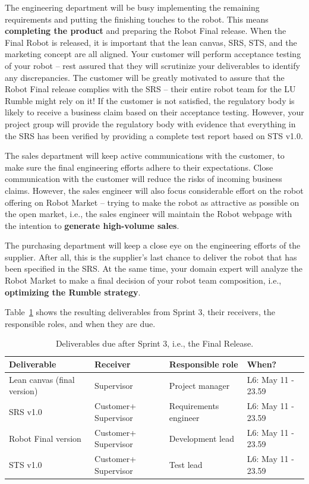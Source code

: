 \documentclass{scrreprt}
\begin{document}
The engineering department will be busy implementing the remaining requirements and putting the finishing touches to the robot. This means \textbf{completing the product} and preparing the Robot Final release. When the Final Robot is released, it is important that the lean canvas, SRS, STS, and the marketing concept are all aligned. Your customer will perform acceptance testing of your robot -- rest assured that they will scrutinize your deliverables to identify any discrepancies. The customer will be greatly motivated to assure that the Robot Final release complies with the SRS -- their entire robot team for the LU Rumble might rely on it! If the customer is not satisfied, the regulatory body is likely to receive a business claim based on their acceptance testing. However, your project group will provide the regulatory body with evidence that everything in the SRS has been verified by providing a complete test report based on STS v1.0.
 
The sales department will keep active communications with the customer, to make sure the final engineering efforts adhere to their expectations. Close communication with the customer will reduce the risks of incoming business claims. However, the sales engineer will also focus considerable effort on the robot offering on Robot Market -- trying to make the robot as attractive as possible on the open market, i.e., the sales engineer will maintain the Robot webpage with the intention to \textbf{generate high-volume sales}.

The purchasing department will keep a close eye on the engineering efforts of the supplier. After all, this is the supplier's last chance to deliver the robot that has been specified in the SRS. At the same time, your domain expert will analyze the Robot Market to make a final decision of your robot team composition, i.e., \textbf{optimizing the Rumble strategy}. 

Table~\ref{tab:sprint3} shows the resulting deliverables from Sprint 3, their receivers, the responsible roles, and when they are due.

\begin{table}[]
\centering
\caption{Deliverables due after Sprint 3, i.e., the Final Release.} %
\label{tab:sprint3}
\begin{tabular}{|p{4cm}|p{2cm}|p{2.5cm}|p{4.5cm}|}
\hline
\textbf{Deliverable}           & \textbf{Receiver}   & \textbf{Responsible role} & \textbf{When?}     \\ \hline
Lean canvas (final version)   & Supervisor          & Project manager           & L6: May 11 - 23.59 \\ \hline
SRS v1.0                       & Customer+ Supervisor & Requirements engineer     & L6: May 11 - 23.59 \\ \hline
Robot Final version        & Customer+ Supervisor & Development lead          & L6: May 11 - 23.59  \\ \hline
STS v1.0        			   & Customer+ Supervisor & Test lead                 & L6: May 11 - 23.59  \\ \hline
\end{tabular}
\end{table}
\end{document}
